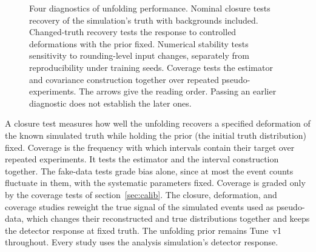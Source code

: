 \begin{figure}[tb]
\centering
{}
\caption[Four diagnostics of unfolding performance]{Four diagnostics of unfolding performance. Nominal closure tests recovery of the simulation's truth with backgrounds included. Changed-truth recovery tests the response to controlled deformations with the prior fixed. Numerical stability tests sensitivity to rounding-level input changes, separately from reproducibility under training seeds. Coverage tests the estimator and covariance construction together over repeated pseudo-experiments. The arrows give the reading order. Passing an earlier diagnostic does not establish the later ones.}
\label{fig:diagnostics}
\end{figure}

A closure test measures how well the unfolding recovers a specified deformation of the known simulated truth while holding the prior (the initial truth distribution) fixed. Coverage is the frequency with which intervals contain their target over repeated experiments. It tests the estimator and the interval construction together. The fake-data tests grade bias alone, since at most the event counts fluctuate in them, with the systematic parameters fixed. Coverage is graded only by the coverage tests of section~\ref{sec:calib}. The closure, deformation, and coverage studies reweight the true signal of the simulated events used as pseudo-data, which changes their reconstructed and true distributions together and keeps the detector response at fixed truth. The unfolding prior remains Tune~v1 throughout. Every study uses the analysis simulation's detector response.

